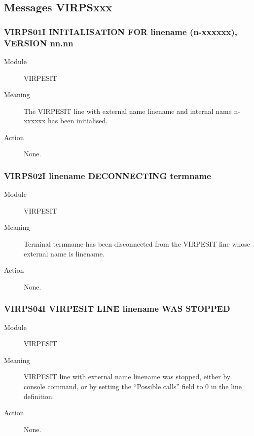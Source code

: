 \documentclass[letterpaper,10pt,english]{sphinxmanual}
\begin{document}
\subsection{Messages VIRPSxxx}
\label{\detokenize{messages:messages-virpsxxx}}

\subsubsection{VIRPS01I INITIALISATION FOR linename (n-xxxxxx), VERSION nn.nn}
\label{\detokenize{messages:virps01i-initialisation-for-linename-n-xxxxxx-version-nn-nn}}\begin{description}
\item[{Module}] \leavevmode
VIRPESIT

\item[{Meaning}] \leavevmode
The VIRPESIT line with external name linename and internal name n-xxxxxx has been initialised.

\item[{Action}] \leavevmode
None.

\end{description}


\subsubsection{VIRPS02I linename DECONNECTING termname}
\label{\detokenize{messages:virps02i-linename-deconnecting-termname}}\begin{description}
\item[{Module}] \leavevmode
VIRPESIT

\item[{Meaning}] \leavevmode
Terminal termname has been disconnected from the VIRPESIT line whose external name is linename.

\item[{Action}] \leavevmode
None.

\end{description}


\subsubsection{VIRPS04I VIRPESIT LINE linename WAS STOPPED}
\label{\detokenize{messages:virps04i-virpesit-line-linename-was-stopped}}\begin{description}
\item[{Module}] \leavevmode
VIRPESIT

\item[{Meaning}] \leavevmode
VIRPESIT line with external name linename was stopped, either by console command, or by setting the “Possible calls” field to 0 in the line definition.

\item[{Action}] \leavevmode
None.

\end{description}
\end{document}
